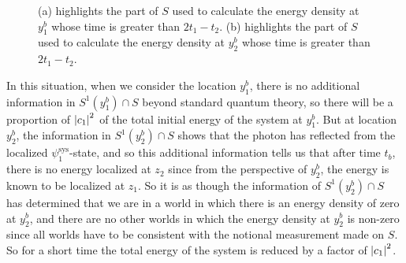 \begin{figure}[ht!]
\vspace*{2px}
\caption{(a) highlights the part of $S$ used to calculate the energy density at $y^b_1$ whose time is greater than $2t_1-t_2$. (b) highlights the part of $S$ used to calculate the energy density at $y^b_2$ whose time is greater than $2t_1-t_2$.}
\label{TM3}
\end{figure}
In this situation, when we consider the location $y^b_1$, there is no additional information in $S^1(y^b_1)\cap S$ beyond standard quantum theory, so there will be a proportion of $\abs{c_1}^2$ of the total initial energy of the system at $y^b_1$. But at location $y^b_2$, the information in $S^1(y^b_2)\cap S$ shows that the photon has reflected from the localized $\psi_1^\text{sys}$-state, and so this additional information tells us that after time $t_b$, there is no energy localized at $z_2$ since from the perspective of $y^b_2$, the energy is known to be localized at $z_1$. So it is as though the information of $S^1(y^b_2)\cap S$ has determined that we are in a world in which there is an energy density of zero at $y^b_2$, and there are no other worlds in which the energy density  at $y^b_2$ is non-zero since all worlds have to be consistent with the notional measurement made on $S$. So for a short time the total energy of the system is reduced by a factor of $\abs{c_1}^2$.  

